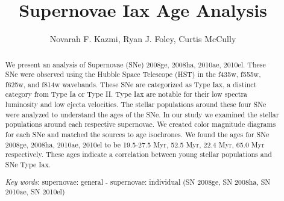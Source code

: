 \documentclass[preprint]{aastex}
\begin{document}
\title{Supernovae Iax Age Analysis}

\author{Novarah F. Kazmi, Ryan J. Foley, Curtis McCully}

\begin{abstract}
\noindent We present an analysis of Supernovae (SNe) 2008ge, 2008ha, 2010ae, 
2010el. These SNe were observed using the Hubble Space Telescope (HST) in the
f435w, f555w, f625w, and f814w wavebands.  %
These SNe are categorized as Type Iax, a distinct category from Type Ia or Type II. 
Type Iax are notable for their low spectra luminosity and low ejecta velocities. 
The stellar populations around these four SNe were analyzed to understand
 the ages of the SNe. In our study we examined the stellar populations
around each respective supernovae. We created color magnitude diagrams 
for each SNe and matched the sources to age isochrones. 
We found the ages for SNe 2008ge, 2008ha, 2010ae, 
2010el to be 19.5-27.5 Myr, 52.5 Myr, 22.4 Myr, 65.0 Myr respectively. 
These ages indicate a correlation between young stellar populations and
SNe Type Iax. 

\noindent\textit{Key words}: supernovae: general - supernovae: individual (SN 2008ge, SN 2008ha, 
SN 2010ae, SN 2010el)%
\end{abstract}
\end{document}
